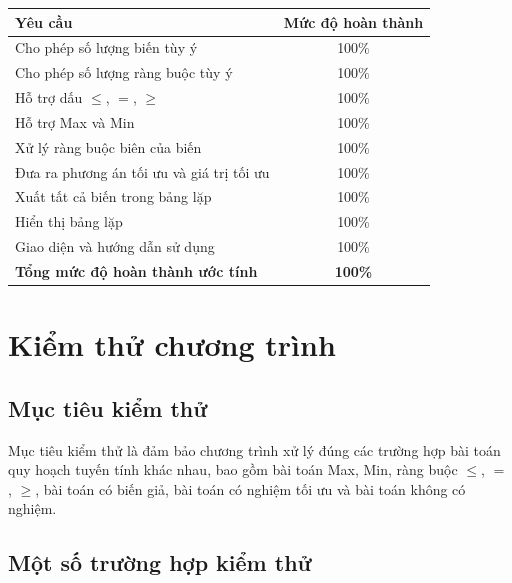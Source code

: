 \documentclass[14pt, a4paper]{extarticle}
\begin{document}
    \begin{longtable}{|p{8cm}|c|}
    \hline
    \textbf{Yêu cầu} & \textbf{Mức độ hoàn thành} \\
    \hline
    Cho phép số lượng biến tùy ý & 100\% \\
    \hline
    Cho phép số lượng ràng buộc tùy ý & 100\% \\
    \hline
    Hỗ trợ dấu $\leq$, $=$, $\geq$ & 100\% \\
    \hline
    Hỗ trợ Max và Min & 100\% \\
    \hline
    Xử lý ràng buộc biên của biến & 100\% \\
    \hline
    Đưa ra phương án tối ưu và giá trị tối ưu & 100\% \\
    \hline
    Xuất tất cả biến trong bảng lặp & 100\% \\
    \hline
    Hiển thị bảng lặp & 100\% \\
    \hline
    Giao diện và hướng dẫn sử dụng & 100\% \\
    \hline
    \textbf{Tổng mức độ hoàn thành ước tính} & \textbf{100\%} \\
    \hline
    \end{longtable}
    
    \section{Kiểm thử chương trình}
    
    \subsection{Mục tiêu kiểm thử}
    
    Mục tiêu kiểm thử là đảm bảo chương trình xử lý đúng các trường hợp bài toán quy hoạch tuyến tính khác nhau, bao gồm bài toán Max, Min, ràng buộc $\leq$, $=$, $\geq$, bài toán có biến giả, bài toán có nghiệm tối ưu và bài toán không có nghiệm.
    
    \subsection{Một số trường hợp kiểm thử}
    
\end{document}
